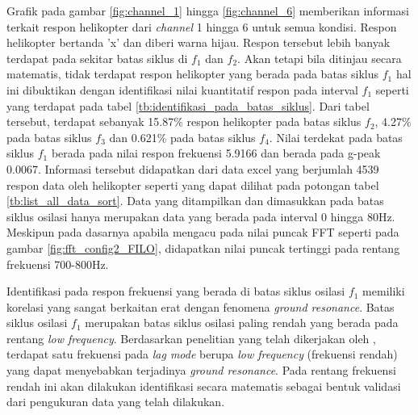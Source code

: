 Grafik pada gambar \ref{fig:channel_1} hingga \ref{fig:channel_6} memberikan informasi terkait respon helikopter dari \textit{channel} 1 hingga 6 untuk semua kondisi. Respon helikopter bertanda 'x' dan diberi warna hijau. Respon tersebut lebih banyak terdapat pada sekitar batas siklus di $f_1$ dan $f_2$. Akan tetapi bila ditinjau secara matematis, tidak terdapat respon helikopter yang berada pada batas siklus $f_1$ hal ini dibuktikan dengan identifikasi nilai kuantitatif respon pada interval $f_1$ seperti yang terdapat pada tabel \ref{tb:identifikasi_pada_batas_siklus}. Dari tabel tersebut, terdapat sebanyak 15.87$\%$ respon helikopter pada batas siklus $f_2$, 4.27$\%$ pada batas siklus $f_3$ dan 0.621$\%$ pada batas siklus $f_4$. Nilai terdekat pada batas siklus $f_1$ berada pada nilai respon frekuensi 5.9166 dan berada pada g-peak 0.0067. Informasi tersebut didapatkan dari data excel yang berjumlah 4539 respon data oleh helikopter seperti yang dapat dilihat pada potongan tabel \ref{tb:list_all_data_sort}. Data yang ditampilkan dan dimasukkan pada batas siklus osilasi hanya merupakan data yang berada pada interval 0 hingga 80Hz. Meskipun pada dasarnya apabila mengacu pada nilai puncak FFT seperti pada gambar \ref{fig:fft_config2_FILO}, didapatkan nilai puncak tertinggi pada rentang frekuensi 700-800Hz.

Identifikasi pada respon frekuensi yang berada di batas siklus osilasi $f_1$ memiliki korelasi yang sangat berkaitan erat dengan fenomena \textit{ground resonance}. Batas siklus osilasi $f_1$ merupakan batas siklus osilasi paling rendah yang berada pada rentang \textit{low frequency}. Berdasarkan penelitian yang telah dikerjakan oleh \cite{Eckert2007AnalyticalAA}, terdapat satu frekuensi pada \textit{lag mode} berupa \textit{low frequency} (frekuensi rendah) yang dapat menyebabkan terjadinya \textit{ground resonance}. Pada rentang frekuensi rendah ini akan dilakukan identifikasi secara matematis sebagai bentuk validasi dari pengukuran data yang telah dilakukan.


